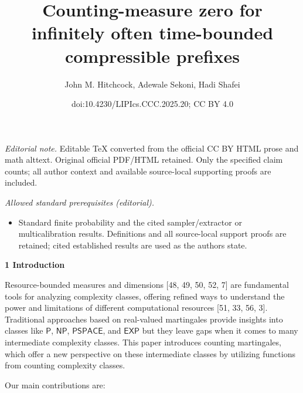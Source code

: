 \documentclass[10pt,a4paper]{article}
\title{Counting-measure zero for infinitely often time-bounded compressible prefixes}
\author{John M. Hitchcock, Adewale Sekoni, Hadi Shafei}
\date{doi:10.4230/LIPIcs.CCC.2025.20; CC BY 4.0}
\begin{document}
\maketitle
\noindent\textit{Editorial note.} Editable TeX converted from the official CC BY HTML prose and math alttext. Original official PDF/HTML retained. Only the specified claim counts; all author context and available source-local supporting proofs are included.\par\medskip
\noindent\textit{Allowed standard prerequisites (editorial).}\begin{itemize}
\item Standard finite probability and the cited sampler/extractor or multicalibration results. Definitions and all source-local support proofs are retained; cited established results are used as the authors state.
\end{itemize}\medskip


\par\medskip\noindent\textbf{
1 Introduction}\par




Resource-bounded measures and dimensions [48, 49, 50, 52, 7] are fundamental tools for analyzing complexity classes, offering refined ways to understand the power and limitations of different computational resources [51, 33, 56, 3].
Traditional approaches based on real-valued martingales provide insights into classes like $\mathsf{P}$, $\mathsf{NP}$, $\mathsf{PSPACE}$, and $\mathsf{EXP}$ but they leave gaps when it comes to many intermediate complexity classes. This paper introduces counting martingales, which offer a new perspective on these intermediate classes by utilizing functions from counting complexity classes.\par




Our main contributions are:\par
\end{document}
